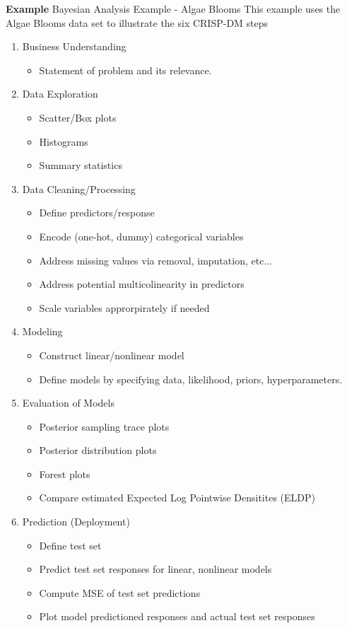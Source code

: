 \documentclass{article}
\begin{document}
\noindent \textbf{Example} Bayesian Analysis Example - Algae Blooms
This example uses the Algae Blooms data set to illustrate the six CRISP-DM steps
\begin{enumerate}
    \item Business Understanding
    \begin{itemize}
        \item Statement of problem and its relevance.
    \end{itemize}
    \item Data Exploration
    \begin{itemize}
        \item Scatter/Box plots
        \item Histograms
        \item Summary statistics
    \end{itemize}
    \item Data Cleaning/Processing
    \begin{itemize}
        \item Define predictors/response
        \item Encode (one-hot, dummy) categorical variables
        \item Address missing values via removal, imputation, etc...
        \item Address potential multicolinearity in predictors
        \item Scale variables approrpirately if needed
    \end{itemize}
    \item Modeling
    \begin{itemize}
        \item Construct linear/nonlinear model
        \item Define models by specifying data, likelihood, priors, hyperparameters.
    \end{itemize}
    \item Evaluation of Models
    \begin{itemize}
        \item Posterior sampling trace plots
        \item Posterior distribution plots
        \item Forest plots
        \item Compare estimated Expected Log Pointwise Densitites (ELDP)
    \end{itemize}
    \item Prediction (Deployment)
    \begin{itemize}
        \item Define test set
        \item Predict test set responses for linear, nonlinear models
        \item Compute MSE of test set predictions
        \item Plot model predictioned responses and actual test set responses
    \end{itemize}
\end{enumerate}
\end{document}

